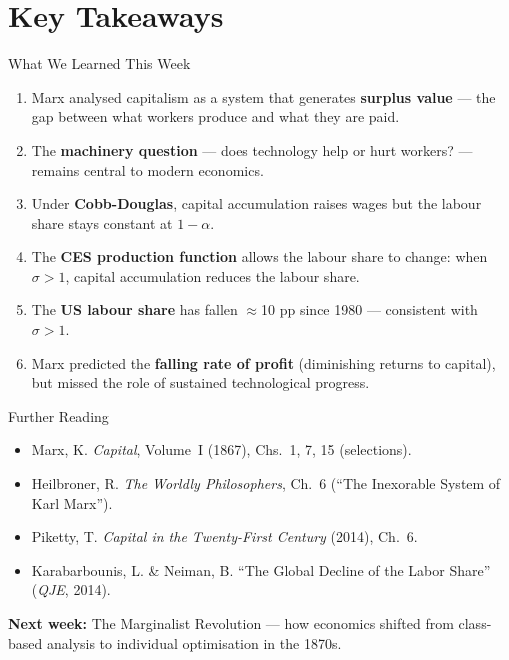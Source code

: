 \documentclass[aspectratio=169, 10pt]{beamer}
\begin{document}
\section{Key Takeaways}

\begin{frame}{What We Learned This Week}
\begin{enumerate}
  \item Marx analysed capitalism as a system that generates
        \textbf{surplus value} --- the gap between what workers
        produce and what they are paid.
  \item The \textbf{machinery question} --- does technology help or
        hurt workers? --- remains central to modern economics.
  \item Under \textbf{Cobb-Douglas}, capital accumulation raises wages
        but the labour share stays constant at $1-\alpha$.
  \item The \textbf{CES production function} allows the labour share
        to change: when $\sigma > 1$, capital accumulation
        \alert{reduces} the labour share.
  \item The \textbf{US labour share} has fallen $\approx$10 pp since
        1980 --- consistent with $\sigma > 1$.
  \item Marx predicted the \textbf{falling rate of profit} (diminishing
        returns to capital), but missed the role of sustained
        technological progress.
\end{enumerate}
\end{frame}

\begin{frame}{Further Reading}
\begin{itemize}
  \item Marx, K. \textit{Capital}, Volume~I (1867), Chs.~1, 7, 15
        (selections).
  \item Heilbroner, R. \textit{The Worldly Philosophers}, Ch.~6
        (``The Inexorable System of Karl Marx'').
  \item Piketty, T. \textit{Capital in the Twenty-First Century}
        (2014), Ch.~6.
  \item Karabarbounis, L. \& Neiman, B. ``The Global Decline of
        the Labor Share'' (\textit{QJE}, 2014).
\end{itemize}
\vspace{1em}
\begin{center}
\textbf{Next week:} The Marginalist Revolution --- how economics shifted
from class-based analysis to individual optimisation in the 1870s.
\end{center}
\end{frame}
\end{document}
